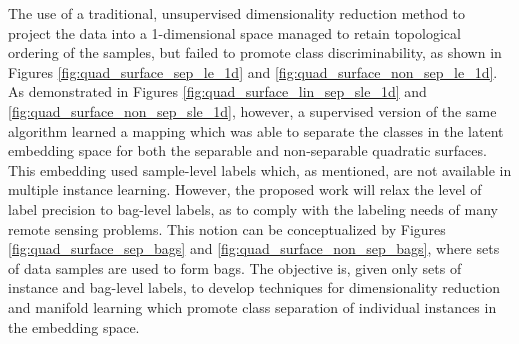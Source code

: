 The use of a traditional, unsupervised dimensionality reduction method to project the data into a 1-dimensional space managed to retain  topological ordering of the samples, but failed to promote class discriminability, as shown in Figures \ref{fig:quad_surface_sep_le_1d} and \ref{fig:quad_surface_non_sep_le_1d}.  As demonstrated in Figures \ref{fig:quad_surface_lin_sep_sle_1d} and \ref{fig:quad_surface_non_sep_sle_1d}, however, a supervised version of the same algorithm learned a mapping which was able to separate the classes in the latent embedding space for both the separable and non-separable quadratic surfaces.  This embedding used sample-level labels which, as mentioned, are not available in multiple instance learning.  However, the proposed work will relax the level of label precision to bag-level labels, as to comply with the labeling needs of many remote sensing problems.  This notion can be conceptualized by Figures \ref{fig:quad_surface_sep_bags} and \ref{fig:quad_surface_non_sep_bags}, where sets of data samples are used to form bags.  The objective is, given only sets of instance and bag-level labels, to develop techniques for dimensionality reduction and manifold learning which promote class separation of individual instances in the embedding space.


